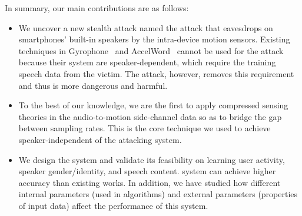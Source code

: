 
%
In summary, our main contributions are as follows:
\begin{itemize}
	\item 
	We uncover a new stealth attack named the {\attackName} attack that eavesdrops on smartphones' built-in speakers by the intra-device motion sensors. Existing techniques in Gyrophone~\cite{michalevsky2014gyrophone} and AccelWord~\cite{zhang2015accelword} cannot be used for the {\attackName}  attack because their system are speaker-dependent, which require the training speech data from the victim. The {\attackName}  attack, however, removes this requirement and thus is more dangerous and harmful.
	
	\item 
	To the best of our knowledge, we are the first to apply compressed sensing theories in the audio-to-motion side-channel data so as to bridge the gap between sampling rates. This is the core technique we used to achieve speaker-independent of the attacking system.
	
	
	\item 
	We design the {\systemName} system and validate its feasibility on learning user activity, speaker gender/identity, and speech content.  {\systemName} system can achieve higher accuracy than existing works. In addition, we have studied how different internal parameters (used in algorithms) and external parameters (properties of input data) affect the  performance of this system.
	
	
%	
\end{itemize}






















%


